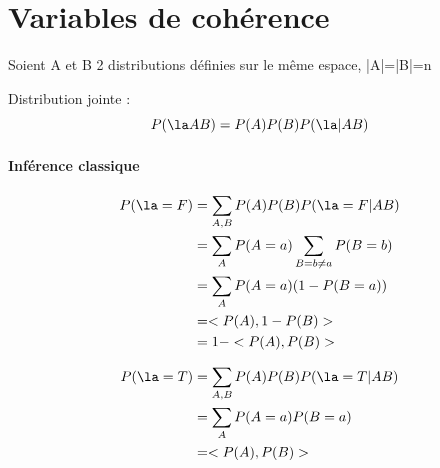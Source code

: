 \documentclass{article}
\begin{document}
\section{Variables de cohérence}
Soient A et B 2 distributions définies sur le même espace, |A|=|B|=n

Distribution jointe : 
$$P(\la A B)=P(A)P(B)P(\la |AB)$$

\paragraph{Inférence classique}
\begin{align*}
P(\la =F) &=  \sum_{A,B}P(A)P(B)P(\la =F|AB) \\
 &= \sum_{A} P(A=a) \sum_{B=b\neq a} P(B=b)\\
 &=  \sum_{A}P(A=a) (1-P(B=a)) \\
 &= <P(A),1-P(B)> \\
 &= 1 -<P(A),P(B)> 
 \end{align*}
 
 \begin{align*}
P(\la =T) &=  \sum_{A,B}P(A)P(B)P(\la =T|AB) \\
 &= \sum_{A} P(A=a) P(B=a)\\
 &= <P(A),P(B)> \\
 \end{align*}
 
\end{document}
